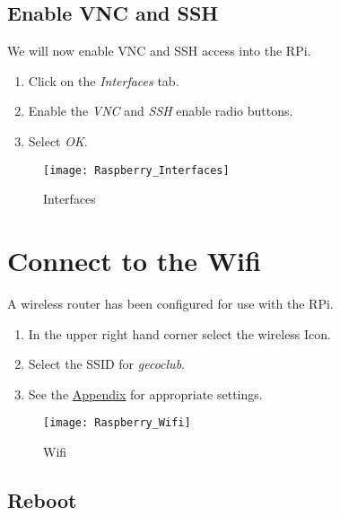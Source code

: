 \documentclass[
a4paper,
fontsize=14pt, %
pagesize, %
parskip=half-, %
]{scrartcl} %
\theoremstyle{mythmstyle} %
\begin{document}
\subsection{Enable VNC and SSH}
We will now enable VNC and SSH access into the RPi.
\begin{enumerate}
    \item Click on the \emph{Interfaces} tab.
    \item Enable the \emph{VNC} and \emph{SSH} enable radio buttons.
    \item Select \emph{OK}.
\end{enumerate}
\begin{figure}[h]
    \centering\texttt{[image: Raspberry\_Interfaces]}
    \caption{Interfaces}
\end{figure}

\clearpage

\section{Connect to the Wifi}
A wireless router has been configured for use with the RPi.
\begin{enumerate}
    \item In the upper right hand corner select the wireless Icon.
    \item Select the SSID for \emph{gecoclub}.
    \item See the \hyperlink{password}{Appendix} for appropriate settings.
    
\end{enumerate}
\begin{figure}[h]
    \centering\texttt{[image: Raspberry\_Wifi]}
    \caption{Wifi}
\end{figure}

\clearpage

\subsection{Reboot}
\end{document}

